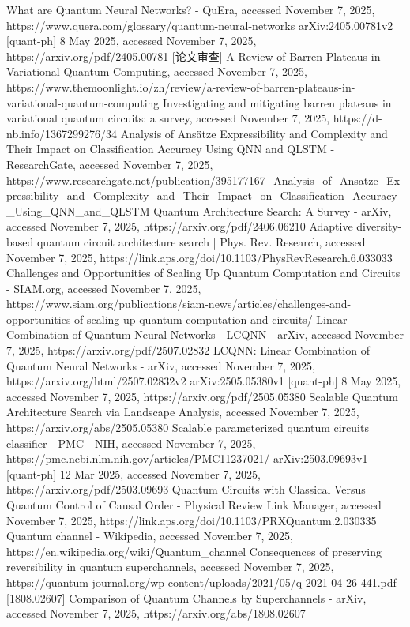 \documentclass[12pt,a4paper]{article}
\begin{document}
What are Quantum Neural Networks? - QuEra, accessed November 7, 2025, https://www.quera.com/glossary/quantum-neural-networks
arXiv:2405.00781v2 [quant-ph] 8 May 2025, accessed November 7, 2025, https://arxiv.org/pdf/2405.00781
[论文审查] A Review of Barren Plateaus in Variational Quantum Computing, accessed November 7, 2025, https://www.themoonlight.io/zh/review/a-review-of-barren-plateaus-in-variational-quantum-computing
Investigating and mitigating barren plateaus in variational quantum circuits: a survey, accessed November 7, 2025, https://d-nb.info/1367299276/34
Analysis of Ansätze Expressibility and Complexity and Their Impact on Classification Accuracy Using QNN and QLSTM - ResearchGate, accessed November 7, 2025, https://www.researchgate.net/publication/395177167_Analysis_of_Ansatze_Expressibility_and_Complexity_and_Their_Impact_on_Classification_Accuracy_Using_QNN_and_QLSTM
Quantum Architecture Search: A Survey - arXiv, accessed November 7, 2025, https://arxiv.org/pdf/2406.06210
Adaptive diversity-based quantum circuit architecture search | Phys. Rev. Research, accessed November 7, 2025, https://link.aps.org/doi/10.1103/PhysRevResearch.6.033033
Challenges and Opportunities of Scaling Up Quantum Computation and Circuits - SIAM.org, accessed November 7, 2025, https://www.siam.org/publications/siam-news/articles/challenges-and-opportunities-of-scaling-up-quantum-computation-and-circuits/
Linear Combination of Quantum Neural Networks - LCQNN - arXiv, accessed November 7, 2025, https://arxiv.org/pdf/2507.02832
LCQNN: Linear Combination of Quantum Neural Networks - arXiv, accessed November 7, 2025, https://arxiv.org/html/2507.02832v2
arXiv:2505.05380v1 [quant-ph] 8 May 2025, accessed November 7, 2025, https://arxiv.org/pdf/2505.05380
Scalable Quantum Architecture Search via Landscape Analysis, accessed November 7, 2025, https://arxiv.org/abs/2505.05380
Scalable parameterized quantum circuits classifier - PMC - NIH, accessed November 7, 2025, https://pmc.ncbi.nlm.nih.gov/articles/PMC11237021/
arXiv:2503.09693v1 [quant-ph] 12 Mar 2025, accessed November 7, 2025, https://arxiv.org/pdf/2503.09693
Quantum Circuits with Classical Versus Quantum Control of Causal Order - Physical Review Link Manager, accessed November 7, 2025, https://link.aps.org/doi/10.1103/PRXQuantum.2.030335
Quantum channel - Wikipedia, accessed November 7, 2025, https://en.wikipedia.org/wiki/Quantum_channel
Consequences of preserving reversibility in quantum superchannels, accessed November 7, 2025, https://quantum-journal.org/wp-content/uploads/2021/05/q-2021-04-26-441.pdf
[1808.02607] Comparison of Quantum Channels by Superchannels - arXiv, accessed November 7, 2025, https://arxiv.org/abs/1808.02607
\end{document}
